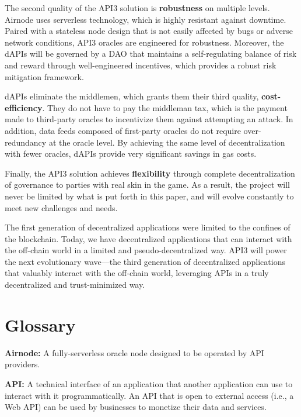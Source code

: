 \documentclass[11pt]{article}
\begin{document}
The second quality of the API3 solution is \textbf{robustness} on multiple levels.
Airnode uses serverless technology, which is highly resistant against downtime.
Paired with a stateless node design that is not easily affected by bugs or adverse network conditions, API3 oracles are engineered for robustness.
Moreover, the dAPIs will be governed by a DAO that maintains a self-regulating balance of risk and reward through well-engineered incentives, which provides a robust risk mitigation framework.

dAPIs eliminate the middlemen, which grants them their third quality, \textbf{cost-efficiency}.
They do not have to pay the middleman tax, which is the payment made to third-party oracles to incentivize them against attempting an attack.
In addition, data feeds composed of first-party oracles do not require over-redundancy at the oracle level.
By achieving the same level of decentralization with fewer oracles, dAPIs provide very significant savings in gas costs.

Finally, the API3 solution achieves \textbf{flexibility} through complete decentralization of governance to parties with real skin in the game.
As a result, the project will never be limited by what is put forth in this paper, and will evolve constantly to meet new challenges and needs.

The first generation of decentralized applications were limited to the confines of the blockchain.
Today, we have decentralized applications that can interact with the off-chain world in a limited and pseudo-decentralized way.
API3 will power the next evolutionary wave---the third generation of decentralized applications that valuably interact with the off-chain world, leveraging APIs in a truly decentralized and trust-minimized way.

\small



\newpage
\normalsize
\appendix
\section{Glossary}

\textbf{Airnode:} A fully-serverless oracle node designed to be operated by API providers.

\textbf{API:} A technical interface of an application that another application can use to interact with it programmatically.
An API that is open to external access (i.e., a Web API) can be used by businesses to monetize their data and services.
\end{document}
